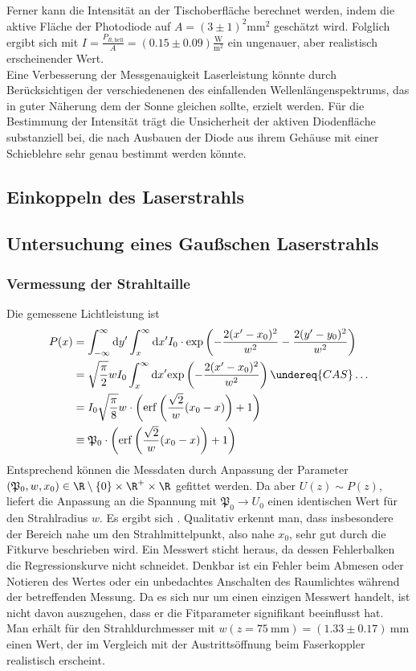 \documentclass[11pt,a4paper,oneside]{scrartcl}
\begin{document}
Ferner kann die Intensität an der Tischoberfläche berechnet werden, indem die aktive Fläche der Photodiode auf $A=(3\pm1)^2\mathrm{mm}^2$ geschätzt wird. Folglich ergibt sich mit $I=\frac{P_{R,\mathrm{hell}}}{A}=(0.15\pm0.09)\frac{\mathrm{W}}{\mathrm m^2}$ ein ungenauer, aber realistisch erscheinender Wert. \\
Eine Verbesserung der Messgenauigkeit Laserleistung könnte durch Berücksichtigen der verschiedenenen des einfallenden Wellenlängenspektrums, das in guter Näherung dem der Sonne gleichen sollte, erzielt werden. Für die Bestimmung der Intensität trägt die Unsicherheit der aktiven Diodenfläche substanziell bei, die nach Ausbauen der Diode aus ihrem Gehäuse mit einer Schieblehre sehr genau bestimmt werden könnte.
\subsection{Einkoppeln des Laserstrahls}
\subsection{Untersuchung eines Gaußschen Laserstrahls}
\subsubsection{Vermessung der Strahltaille}\label{Auswertung Vermessung der Strahltaille}
Die gemessene Lichtleistung ist 
\begin{align}
P(x)&=\int_{-\infty}^\infty \mathrm dy^\prime \int_x^\infty \mathrm dx^\prime I_0\cdot\mathrm{exp}\left(-\frac{2(x^\prime-x_0)^2}{w^2}-\frac{2(y^\prime-y_0)^2}{w^2}\right) \\ \quad& = \sqrt{\frac{\pi}{2}}wI_0\int_x^\infty \mathrm dx^\prime \mathrm{exp}\left(-\frac{2(x^\prime-x_0)^2}{w^2}\right) \undereq{CAS}\hdots \\ \quad& =I_0\sqrt{\frac{\pi}{8}}w\cdot\left(\mathrm{erf}\left(\frac{\sqrt{2}}{w}(x_0-x)\right)+1\right)\\ \quad& \equiv \mathfrak{P}_0\cdot\left(\mathrm{erf}\left(\frac{\sqrt{2}}{w}(x_0-x)\right)+1\right)
\end{align}
Entsprechend können die Messdaten durch Anpassung der Parameter $(\mathfrak P_0,w,x_0)\in \R\setminus\{0\}\times\R^+\times\R$ gefittet werden. Da aber $U(z)\sim P(z)$, liefert die Anpassung an die Spannung mit $\mathfrak P_0\rightarrow U_0$ einen identischen Wert für den Strahlradius $w$.
Es ergibt sich . Qualitativ erkennt man, dass insbesondere der Bereich nahe um den Strahlmittelpunkt, also nahe $x_0$, sehr gut durch die Fitkurve beschrieben wird. Ein Messwert sticht heraus, da dessen Fehlerbalken die Regressionskurve nicht schneidet. Denkbar ist ein Fehler beim Abmesen oder Notieren des Wertes oder ein unbedachtes Anschalten des Raumlichtes während der betreffenden Messung. Da es sich nur um einen einzigen Messwert handelt, ist nicht davon auszugehen, dass er die Fitparameter signifikant beeinflusst hat. \\
Man erhält für den Strahldurchmesser mit $w(z=75\ \mathrm{mm})=(1.33\pm0.17)\ \mathrm{mm}$ einen Wert, der im Vergleich mit der Austrittsöffnung beim Faserkoppler realistisch erscheint.
\end{document}
